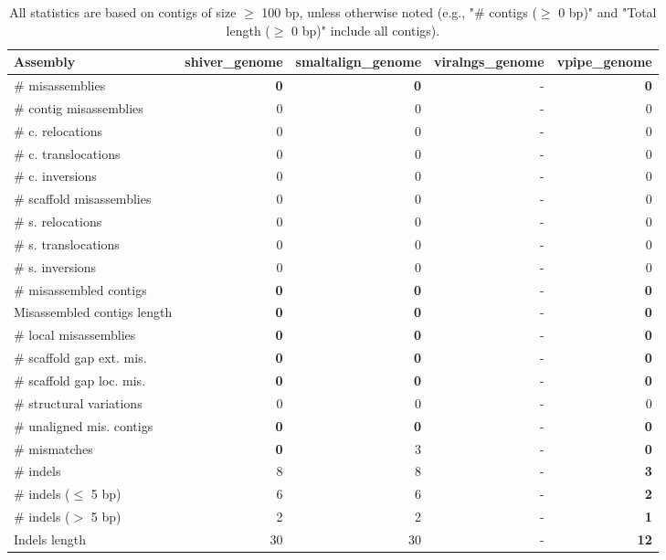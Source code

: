 \documentclass[12pt,a4paper]{article}
\begin{document}
\begin{table}[ht]
\begin{center}
\caption{All statistics are based on contigs of size $\geq$ 100 bp, unless otherwise noted (e.g., "\# contigs ($\geq$ 0 bp)" and "Total length ($\geq$ 0 bp)" include all contigs).}
\begin{tabular}{|l*{4}{|r}|}
\hline
Assembly & shiver\_genome & smaltalign\_genome & viralngs\_genome & vpipe\_genome \\ \hline
\# misassemblies & {\bf 0} & {\bf 0} & - & {\bf 0} \\ \hline
\hspace{2mm}\# contig misassemblies & 0 & 0 & - & 0 \\ \hline
\hspace{5mm}\# c. relocations & 0 & 0 & - & 0 \\ \hline
\hspace{5mm}\# c. translocations & 0 & 0 & - & 0 \\ \hline
\hspace{5mm}\# c. inversions & 0 & 0 & - & 0 \\ \hline
\hspace{2mm}\# scaffold misassemblies & 0 & 0 & - & 0 \\ \hline
\hspace{5mm}\# s. relocations & 0 & 0 & - & 0 \\ \hline
\hspace{5mm}\# s. translocations & 0 & 0 & - & 0 \\ \hline
\hspace{5mm}\# s. inversions & 0 & 0 & - & 0 \\ \hline
\# misassembled contigs & {\bf 0} & {\bf 0} & - & {\bf 0} \\ \hline
Misassembled contigs length & {\bf 0} & {\bf 0} & - & {\bf 0} \\ \hline
\# local misassemblies & {\bf 0} & {\bf 0} & - & {\bf 0} \\ \hline
\# scaffold gap ext. mis. & {\bf 0} & {\bf 0} & - & {\bf 0} \\ \hline
\# scaffold gap loc. mis. & {\bf 0} & {\bf 0} & - & {\bf 0} \\ \hline
\# structural variations & 0 & 0 & - & 0 \\ \hline
\# unaligned mis. contigs & {\bf 0} & {\bf 0} & - & {\bf 0} \\ \hline
\# mismatches & {\bf 0} & 3 & - & {\bf 0} \\ \hline
\# indels & 8 & 8 & - & {\bf 3} \\ \hline
\hspace{5mm}\# indels ($\leq$ 5 bp) & 6 & 6 & - & {\bf 2} \\ \hline
\hspace{5mm}\# indels ($>$ 5 bp) & 2 & 2 & - & {\bf 1} \\ \hline
Indels length & 30 & 30 & - & {\bf 12} \\ \hline
\end{tabular}
\end{center}
\end{table}
\end{document}
